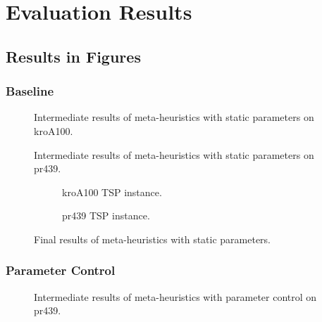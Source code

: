 \chapter{Evaluation Results}
\section{Results in Figures}

\subsection{Baseline}\label{app:eval:bl plots}

\begin{figure}[!htbp]
	\centering
	
	\caption{Intermediate results of meta-heuristics with static parameters on kroA100.}
	\label{app:eval:1:bl:kroA100 intermediate}
\end{figure}

\begin{figure}[!htbp]
	\centering
	
	\caption{Intermediate results of meta-heuristics with static parameters on pr439.}
	\label{app:eval:1:bl:pr439 intermediate}
\end{figure}


\begin{figure}[!htbp]
	\centering
	\begin{subfigure}{0.45\textwidth}
		
		\caption{kroA100 TSP instance.}
		\label{app:eval:1:bl:kroA100 final}
	\end{subfigure}
	\begin{subfigure}{0.45\textwidth}
		
		\caption{pr439 TSP instance.}
		\label{app:eval:1:bl:pr439 final}
	\end{subfigure}
	\caption{Final results of meta-heuristics with static parameters.}
	
\end{figure}

\FloatBarrier
\subsection{Parameter Control}\label{app:eval:pc plots}
\begin{figure}[!htbp]
	\centering
	
	\caption{Intermediate results of meta-heuristics with parameter control on pr439.}
	\label{app:eval:1:pc:pr439 intermediate}
\end{figure}

